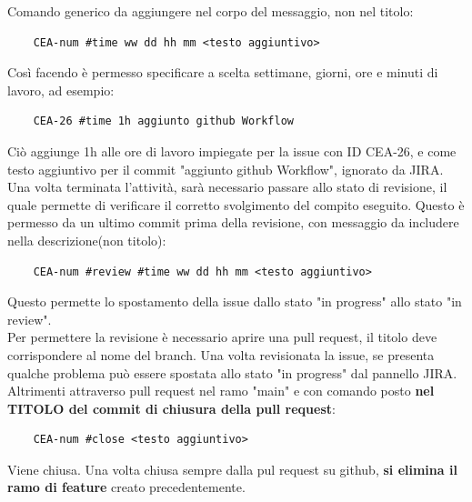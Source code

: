     Comando generico da aggiungere nel corpo del messaggio, non nel titolo:
    \begin{lstlisting}
    CEA-num #time ww dd hh mm <testo aggiuntivo>
    \end{lstlisting}
    Così facendo è permesso specificare a scelta settimane, giorni, ore e minuti di lavoro, ad esempio:
    \begin{lstlisting}
    CEA-26 #time 1h aggiunto github Workflow
    \end{lstlisting}
    Ciò aggiunge 1h alle ore di lavoro impiegate per la issue con ID CEA-26, e come testo aggiuntivo per il commit "aggiunto github Workflow", ignorato da JIRA.\\
    Una volta terminata l'attività, sarà necessario passare allo stato di revisione, il quale permette di verificare il corretto svolgimento del compito eseguito. Questo è permesso da un ultimo commit prima della revisione, con messaggio da includere nella descrizione(non titolo):
    \begin{lstlisting}
    CEA-num #review #time ww dd hh mm <testo aggiuntivo>
    \end{lstlisting}
    Questo permette lo spostamento della issue dallo stato "in progress" allo stato "in review".\\
    Per permettere la revisione è necessario aprire una pull request, il titolo deve corrispondere al nome del branch.
    Una volta revisionata la issue, se presenta qualche problema può essere spostata allo stato "in progress" dal pannello JIRA. Altrimenti attraverso pull request nel ramo "main" e con comando posto \textbf{nel TITOLO del commit di chiusura della pull request}:
    \begin{lstlisting}
    CEA-num #close <testo aggiuntivo>
    \end{lstlisting}
    Viene chiusa. Una volta chiusa sempre dalla pul request su github, \textbf{si elimina il ramo di feature} creato precedentemente.

